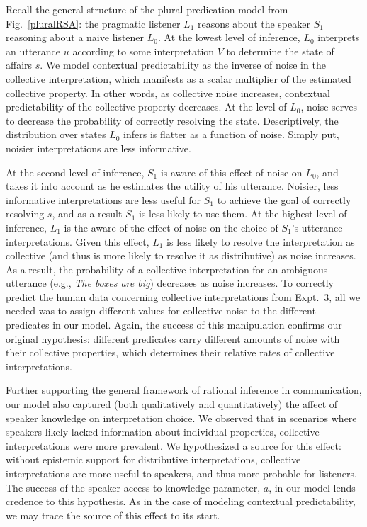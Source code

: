 \documentclass[linguex]{sp}
\begin{document}
Recall the general structure of the plural predication model from Fig.~\ref{pluralRSA}: the pragmatic listener $L_{1}$ reasons about the speaker $S_{1}$ reasoning about a naive listener $L_{0}$. At the lowest level of inference, $L_{0}$ interprets an utterance $u$ according to some interpretation $V$ to determine the state of affairs $s$. We model contextual predictability as the inverse of noise in the collective interpretation, which manifests as a scalar multiplier of the estimated collective property. In other words, as collective noise increases, contextual predictability of the collective property decreases. At the level of $L_{0}$, noise serves to decrease the probability of correctly resolving the state. Descriptively, the distribution over states $L_{0}$ infers is flatter as a function of noise. Simply put, noisier interpretations are less informative.

At the second level of inference, $S_{1}$ is aware of this effect of noise on $L_{0}$, and takes it into account as he estimates the utility of his utterance. Noisier, less informative interpretations are less useful for $S_{1}$ to achieve the goal of correctly resolving $s$, and as a result $S_{1}$ is less likely to use them. At the highest level of inference, $L_{1}$ is the aware of the effect of noise on the choice of $S_{1}$'s utterance interpretations. Given this effect, $L_{1}$ is less likely to resolve the interpretation as collective (and thus is more likely to resolve it as distributive) as noise increases. As a result, the probability of a collective interpretation for an ambiguous utterance (e.g., \emph{The boxes are big}) decreases as noise increases. To correctly predict the human data concerning collective interpretations from Expt.~3, all we needed was to assign different values for collective noise to the different predicates in our model. Again, the success of this manipulation confirms our original hypothesis: different predicates carry different amounts of noise with their collective properties, which determines their relative rates of collective interpretations.

Further supporting the general framework of rational inference in communication, our model also captured (both qualitatively and quantitatively) the affect of speaker knowledge on interpretation choice. We observed that in scenarios where speakers likely lacked information about individual properties, collective interpretations were more prevalent. We hypothesized a source for this effect: without epistemic support for distributive interpretations, collective interpretations are more useful to speakers, and thus more probable for listeners. The success of the speaker access to knowledge parameter, $a$, in our model lends credence to this hypothesis. As in the case of modeling contextual predictability, we may trace the source of this effect to its start.
\end{document}
